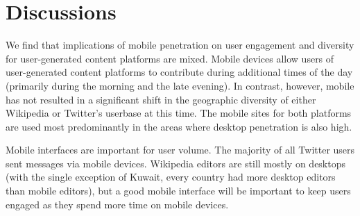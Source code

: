 \documentclass{sigchi}
\begin{document}

% 


\section{Discussions}

We find that implications of mobile penetration on user engagement and diversity for user-generated content platforms are mixed. Mobile devices allow users of user-generated content platforms to contribute during additional times of the day (primarily during the morning and the late evening). In contrast, however, mobile has not resulted in a significant shift in the geographic diversity of either Wikipedia or Twitter's userbase at this time. The mobile sites for both platforms are used most predominantly in the areas where desktop penetration is also high.

Mobile interfaces are important for user volume. The majority of all Twitter users sent messages via mobile devices. Wikipedia editors are still mostly on desktops (with the single exception of Kuwait, every country had more desktop editors than mobile editors), but a good mobile interface will be important to keep users engaged as they spend more time on mobile devices.

\end{document}
